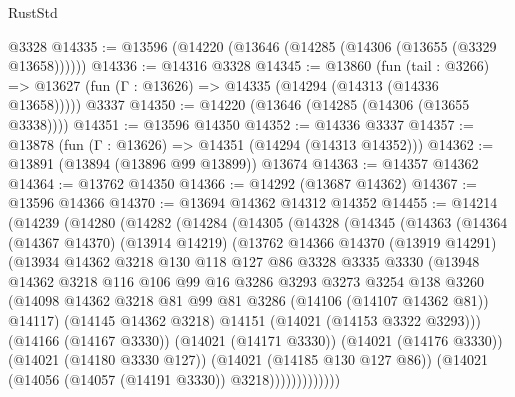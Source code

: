 \begin{lexlean}{RustStd}
\begin{coremodule}
    @3328
@14335 := @13596 (@14220 (@13646 (@14285 (@14306 (@13655 (@3329 @13658))))))
@14336 := @14316 @3328
@14345 := @13860
    (fun (tail : @3266) => @13627 (fun (Γ : @13626) => @14335 (@14294 (@14313 (@14336 @13658)))))
    @3337
@14350 := @14220 (@13646 (@14285 (@14306 (@13655 @3338))))
@14351 := @13596 @14350
@14352 := @14336 @3337
@14357 := @13878 (fun (Γ : @13626) => @14351 (@14294 (@14313 @14352)))
@14362 := @13891 (@13894 (@13896 @99 @13899)) @13674
@14363 := @14357 @14362
@14364 := @13762 @14350
@14366 := @14292 (@13687 @14362)
@14367 := @13596 @14366
@14370 := @13694 @14362 @14312 @14352
@14455 := @14214
    (@14239
      (@14280
        (@14282
          (@14284
            (@14305
              (@14328
                (@14345
                  (@14363
                    (@14364
                      (@14367 @14370)
                      (@13914 @14219)
                      (@13762
                        @14366
                        @14370
                        (@13919 @14291)
                        (@13934
                          @14362
                          @3218
                          @130
                          @118
                          @127
                          @86
                          @3328
                          @3335
                          @3330
                          (@13948
                            @14362
                            @3218
                            @116
                            @106
                            @99
                            @16
                            @3286
                            @3293
                            @3273
                            @3254
                            @138
                            @3260
                            (@14098
                              @14362
                              @3218
                              @81
                              @99
                              @81
                              @3286
                              (@14106 (@14107 @14362 @81))
                              @14117)
                            (@14145 @14362 @3218)
                            @14151
                            (@14021 (@14153 @3322 @3293)))
                          (@14166 (@14167 @3330))
                          (@14021 (@14171 @3330))
                          (@14021 (@14176 @3330))
                          (@14021 (@14180 @3330 @127))
                          (@14021 (@14185 @130 @127 @86))
                          (@14021 (@14056 (@14057 (@14191 @3330)) @3218)))))))))))))

\end{coremodule}
\end{lexlean}
